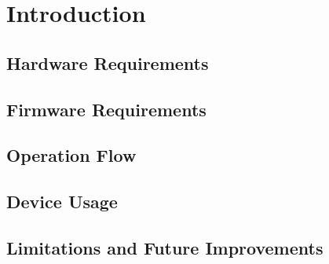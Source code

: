 \newpage

\section{Introduction}\label{01Sec:Introduction}

\cite{Franklin2013}

\subsection{Hardware Requirements}\label{01Sub:HardwareRequirements}


\subsection{Firmware Requirements}\label{01Sub:FirmwareRequirements}


\subsection{Operation Flow}\label{01Sub:OperationFlow}


\subsection{Device Usage}\label{01Sub:DeviceUsage}


\subsection{Limitations and Future Improvements}\label{01Sub:LimitationsAndFutureImprovements}




